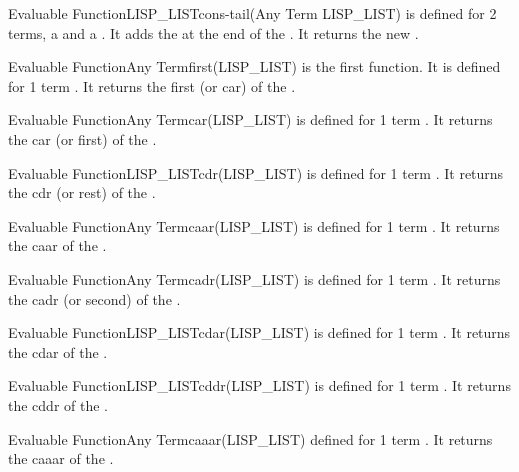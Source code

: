 \begin{typeefa}{Evaluable Function}{LISP\_LIST}{cons-tail}{(Any Term LISP\_LIST)}
is defined for 2 terms, a  and a .  It adds the
 at the end of the .  It returns the new
.
\end{typeefa}

\begin{typeefa}{Evaluable Function}{Any Term}{first}{(LISP\_LIST)}
is the first function. It is defined for 1 term . It returns the
first (or car)  of the .
\end{typeefa}

\begin{typeefa}{Evaluable Function}{Any Term}{car}{(LISP\_LIST)}
is defined for 1 term . It returns the car (or first)  of
the .
\end{typeefa}

\begin{typeefa}{Evaluable Function}{LISP\_LIST}{cdr}{(LISP\_LIST)}
is defined for 1 term . It returns the cdr (or rest)  of
the .
\end{typeefa}

\begin{typeefa}{Evaluable Function}{Any Term}{caar}{(LISP\_LIST)}
is defined for 1 term . It returns the caar  of the
.
\end{typeefa}

\begin{typeefa}{Evaluable Function}{Any Term}{cadr}{(LISP\_LIST)}
is defined for 1 term . It returns the cadr (or second) 
of the .
\end{typeefa}

\begin{typeefa}{Evaluable Function}{LISP\_LIST}{cdar}{(LISP\_LIST)}
is defined for 1 term . It returns the cdar  of the
.
\end{typeefa}

\begin{typeefa}{Evaluable Function}{LISP\_LIST}{cddr}{(LISP\_LIST)}
is defined for 1 term . It returns the cddr  of the
.
\end{typeefa}

\begin{typeefa}{Evaluable Function}{Any Term}{caaar}{(LISP\_LIST)}
defined for 1 term . It returns the caaar  of the
.
\end{typeefa}

